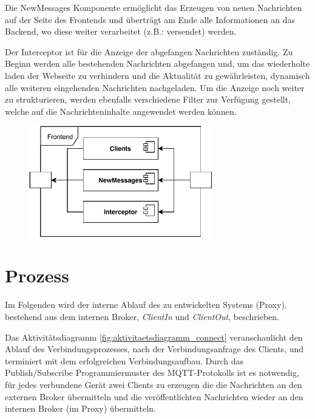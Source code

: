     Die NewMessages Komponente ermöglicht das Erzeugen von neuen Nachrichten auf der Seite des Frontends und überträgt am Ende alle Informationen an das Backend, wo diese weiter verarbeitet (z.B.: versendet) werden.
    
    Der Interceptor ist für die Anzeige der abgefangen Nachrichten zuständig. Zu Beginn werden alle bestehenden Nachrichten abgefangen und, um das wiederholte laden der Webseite zu verhindern und die Aktualität zu gewährleisten, dynamisch alle weiteren eingehenden Nachrichten nachgeladen. Um die Anzeige noch weiter zu strukturieren, werden ebenfalls verschiedene Filter zur Verfügung gestellt, welche auf die Nachrichteninhalte angewendet werden können.
    \begin{figure}[h]%
        \centering
        \includegraphics[width=8cm]{tex/bilder/4_konzept/Systemdiagramm_Konzept_Frontend.pdf}
        \label{fig:system_frontend}
    \end{figure}

\section{Prozess}
    Im Folgenden wird der interne Ablauf des zu entwickelten Systems (Proxy), bestehend aus dem internen Broker, \emph{ClientIn} und \emph{ClientOut}, beschrieben.

    Das Aktivitätsdiagramm \ref{fig:aktivitaetsdiagramm_connect} veranschaulicht den Ablauf des Verbindungsprozesses, nach der Verbindungsanfrage des Clients, und terminiert mit dem erfolgreichen Verbindungsaufbau.
    Durch das Publish/Subscribe Programmiermuster des \ac{MQTT}-Protokolls ist es notwendig, für jedes verbundene Gerät zwei Clients zu erzeugen die die Nachrichten an den externen Broker übermitteln und die veröffentlichten Nachrichten wieder an den internen Broker (im Proxy) übermitteln.
    
